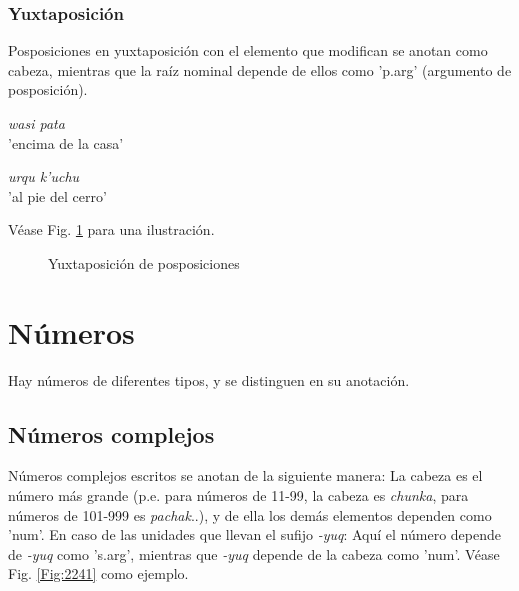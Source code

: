 \documentclass[a4paper,11pt,DIV12]{scrartcl}
\begin{document}
  \subsubsection{Yuxtaposici\'on}\label{Sec:yuxta}
Posposiciones en yuxtaposici\'on con el elemento que modifican se anotan como cabeza, mientras que la ra\'iz nominal depende de ellos como 'p.arg' (argumento de posposici\'on).

\begin{examples}
 \item {\em wasi pata}\\
      'encima de la casa'
 \item {\em urqu k'uchu}\\
      'al pie del cerro'\\
  		\hfill{\small \citep[140]{Cusi2}}
\end{examples}

V\'ease Fig. \ref{Fig:posyuxta} para una ilustraci\'on.

\begin{figure}
\begin{center}
 \caption{Yuxtaposici\'on de posposiciones}\label{Fig:posyuxta}
\end{center}
\end{figure}

\section{N\'umeros}
Hay n\'umeros de diferentes tipos, y se distinguen en su anotaci\'on.

  \subsection{N\'umeros complejos}\label{Sec:numcomplejos}
 N\'umeros complejos escritos se anotan de la siguiente manera: La cabeza es el n\'umero m\'as grande (p.e. para n\'umeros de 11-99, la cabeza es {\em chunka}, para n\'umeros de 101-999 es {\em pachak}..), y de ella los dem\'as elementos dependen como 'num'. En caso de las unidades que llevan el sufijo {\em -yuq}: Aqu\'i el n\'umero depende de {\em -yuq} como 's.arg', mientras que {\em -yuq} depende de la cabeza como 'num'. V\'ease Fig. \ref{Fig:2241} como ejemplo.
\end{document}
